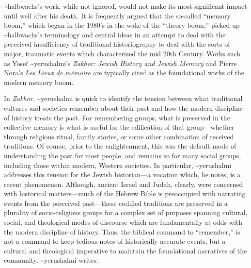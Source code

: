 \textasciitilde{}halbwachs's work, while not ignored, would not make its
most significant impact until well after his death. It is frequently
argued that the so-called ``memory boom,'' which began in the 1980's in
the wake of the ``theory boom,'' picked up \textasciitilde{}halbwachs's
terminology and central ideas in an attempt to deal with the perceived
insufficiency of traditional historiography to deal with the sorts of
major, traumatic events which characterized the mid 20th
Century.\autocites[1--2]{galinsky_galinsky2016}[See also][29--36. One
cannot help but speculate that---at least in the English-speaking
world---the translation of \emph{The Collective Memory} in 1980
contributed to the popularity of \textasciitilde{}halbwachs's
terminology.]{olick_olick-etal2011} Works such as Yosef
\textasciitilde{}yerushalmi's \emph{Zakhor: Jewish History and Jewish
Memory} and Pierre Nora's \emph{Les Lieux de mémoire} are typically
cited as the foundational works of the modern memory
boom.\autocites[112--113]{klein2011}{yerushalmi1989}[Nora's massive
project has been abridged and translated into English as][]{nora1996}

In \emph{Zakhor}, \textasciitilde{}yerushalmi is quick to identify the
tension between what traditional cultures and societies remember about
their past and how the modern discipline of history treats the past. For
remembering groups, what is preserved in the collective memory is what
is useful for the edification of that group---whether through religious
ritual, family stories, or some other combination of received
traditions. Of course, prior to the enlightenment, this was the default
mode of understanding the past for most people, and remains so for many
social groups, including those within modern, Western societies. In
particular, \textasciitilde{}yerushalmi addresses this tension for the
Jewish historian---a vocation which, he notes, is a recent phenomenon.
Although, ancient Israel and Judah, clearly, were concerned with
historical matters---much of the Hebrew Bible is preoccupied with
narrating events from the perceived past---these codified traditions are
preserved in a plurality of socio-religious groups for a complex set of
purposes spanning cultural, social, and theological modes of discourse
which are fundamentally at odds with the modern discipline of history.
Thus, the biblical command to ``remember,'' is not a command to keep
tedious notes of historically accurate events, but a cultural and
theological imperative to maintain the foundational narratives of the
community. \textasciitilde{}yerushalmi writes:

